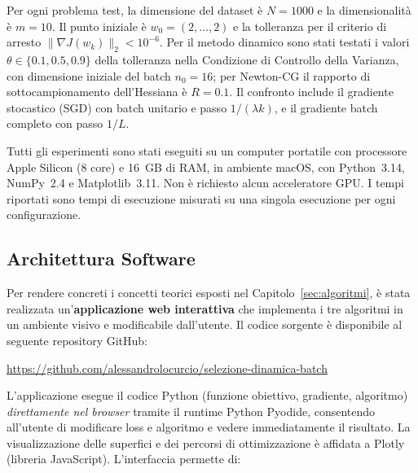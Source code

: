\documentclass[a4paper,12pt]{article}
\numberwithin{equation}{section}
\numberwithin{figure}{section}
\numberwithin{table}{section}
\begin{document}
Per ogni problema test, la dimensione del dataset è $N = 1000$ e la
dimensionalità è $m = 10$. Il punto iniziale è $w_0 = (2,\dots,2)$ e la
tolleranza per il criterio di arresto $\|\nabla J(w_k)\|_2 < 10^{-6}$. Per il
metodo dinamico sono stati testati i valori $\theta \in \{0.1, 0.5, 0.9\}$
della tolleranza nella Condizione di Controllo della Varianza, con dimensione
iniziale del batch $n_0 = 16$; per Newton-CG il rapporto di sottocampionamento
dell'Hessiana è $R = 0.1$. Il confronto include il gradiente stocastico (SGD)
con batch unitario e passo $1/(\lambda k)$, e il gradiente batch completo
con passo $1/L$.

Tutti gli esperimenti sono stati eseguiti su un computer portatile con
processore Apple Silicon (8 core) e 16~GB di RAM, in ambiente macOS, con
Python~3.14, NumPy~2.4 e Matplotlib~3.11. Non è richiesto alcun acceleratore
GPU. I tempi riportati sono tempi di esecuzione misurati su una singola
esecuzione per ogni configurazione.

\subsection{Architettura Software}\label{sec:architettura}

Per rendere concreti i concetti teorici esposti nel
Capitolo~\ref{sec:algoritmi}, è stata realizzata un'\textbf{applicazione web
interattiva} che implementa i tre algoritmi in un ambiente visivo e
modificabile dall'utente. Il codice sorgente è disponibile al seguente
repository GitHub:
\begin{center}
  \url{https://github.com/alessandrolocurcio/selezione-dinamica-batch}
\end{center}

L'applicazione esegue il codice Python (funzione obiettivo, gradiente,
algoritmo) \emph{direttamente nel browser} tramite il runtime Python
Pyodide, consentendo all'utente di modificare loss e algoritmo e vedere
immediatamente il risultato. La visualizzazione delle superfici e dei
percorsi di ottimizzazione è affidata a Plotly (libreria JavaScript).
L'interfaccia permette di:
\end{document}
